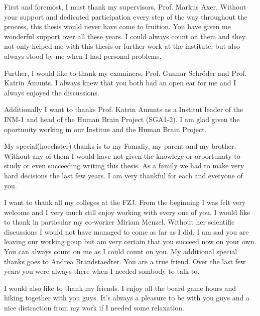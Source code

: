 \label{sec:acknowledgement}
%
%
% 
First and foremost, I must thank my supervisors, Prof. Markus Axer.
Without your support and dedicated participation every step of the way throughout the process, this thesis would never have come to fruition. 
You have given me wonderful support over all these years.
I could always count on them and they not only helped me with this thesis or further work at the institute, but also always stood by me when I had personal problems.

Further, I would like to thank my examiners, Prof. Gunnar Schröder and Prof. Katrin Amunts.
I always knew that you both had an open ear for me and I always enjoyed the discussions.

Additionally I want to thanks Prof. Katrin Amunts as a Institut leader of the INM-1 and head of the Human Brain Project (SGA1-2).
I am glad given the oportunity working in our Institue and the Human Brain Project.

My special(hoechster) thanks is to my Famaliy, my parent and my brother.
Without any of them I would have not given the knowlege or orportunaty to study or even succeeding writing this thesis.
As a family we had to make very hard decisions the last few years.
I am very thankful for each and everyone of you.

I want to thank all my colleges at the FZJ.
From the beginning I was felt very welcome and I very much still enjoy working with every one of you.
I would like to thank in particular my co-worker Miriam Menzel.
Without her scientific discussions I would not have managed to come as far as I did.
I am sad you are leaving our working goup but am very certain that you succeed now on your own.
You can always count on me as I could count on you.
My additional special thanks goes to Andrea Brandstaedter.
You are a true friend.
Over the last few years you were always there when I needed sombody to talk to.

I would also like to thank my friends.
I enjoy all the board game hours and hiking together with you guys.
It's always a pleasure to be with you guys and a nice distraction from my work if I needed some relaxation.
